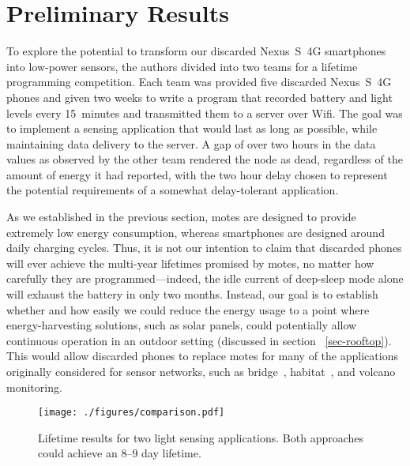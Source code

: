 \section{Preliminary Results}
\label{sec-results}

To explore the potential to transform our discarded Nexus~S~4G smartphones
into low-power sensors, the authors divided into two teams for a lifetime
programming competition. Each team was provided five discarded Nexus~S~4G
phones and given two weeks to write a program that recorded battery and light
levels every 15~minutes and transmitted them to a server over Wifi. The goal
was to implement a sensing application that would last as long as possible,
while maintaining data delivery to the server. A gap of over two hours in the
data values as observed by the other team rendered the node as dead,
regardless of the amount of energy it had reported, with the two hour delay
chosen to represent the potential requirements of a somewhat delay-tolerant
application. 

As we established in the previous section, motes are designed to provide
extremely low energy consumption, whereas smartphones are designed around
daily charging cycles. Thus, it is not our intention to claim that discarded
phones will ever achieve the multi-year lifetimes promised by motes, no
matter how carefully they are programmed---indeed, the idle current of
deep-sleep mode alone will exhaust the battery in only two months. Instead,
our goal is to establish whether and how easily we could reduce the energy
usage to a point where energy-harvesting solutions, such as solar panels,
could potentially allow continuous operation in an outdoor setting (discussed
in section ~\ref{sec-rooftop}). This
would allow discarded phones to replace motes for many of the applications
originally considered for sensor networks, such as
bridge~\cite{ggb-monitoring}, habitat~\cite{gdi}, and
volcano~\cite{lance-sensys08} monitoring.

\begin{figure}[t]
\texttt{[image: ./figures/comparison.pdf]}

\vspace*{-0.1in}

\caption{\small Lifetime results for two light sensing applications.
\textnormal{Both approaches could achieve an 8--9 day lifetime.}}

\vspace*{-0.1in}

\label{fig-comparison}
\end{figure}

